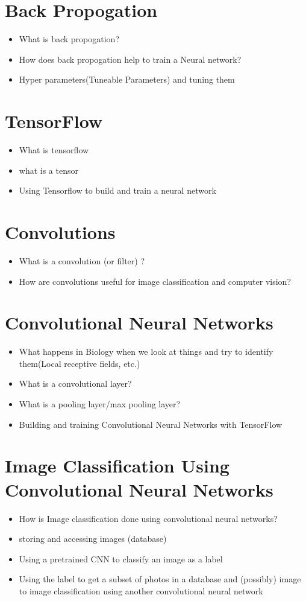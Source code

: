 \documentclass[12pt]{article} %
\begin{document}
\section{Back Propogation}
\begin{itemize}
\item What is back propogation?
\item How does back propogation help to train a Neural network?
\item Hyper parameters(Tuneable Parameters) and tuning them
\end{itemize}

\section{TensorFlow}
\begin{itemize}
\item What is tensorflow
\item what is a tensor
\item Using Tensorflow to build and train a neural network
\end{itemize}


\section{Convolutions}
\begin{itemize}
\item What is a convolution (or filter) ?
\item How are convolutions useful for image classification and computer vision?
\end{itemize}

\section{Convolutional Neural Networks}
\begin{itemize}
\item What happens in Biology when we look at things and try to identify them(Local receptive fields, etc.)
\item What is a convolutional layer?
\item What is a pooling layer/max pooling layer?
\item Building and training Convolutional Neural Networks with TensorFlow
\end{itemize}

\section{Image Classification Using Convolutional Neural Networks}
\begin{itemize}
\item How is Image classification done using convolutional neural networks?
\item storing and accessing images (database)
\item Using a pretrained CNN to classify an image as a label
\item Using the label to get a subset of photos in a database and (possibly) image to image classification using another convolutional neural network
\end{itemize}
\end{document}
